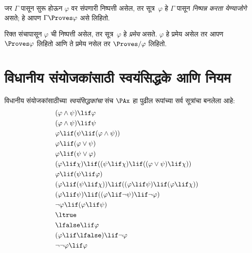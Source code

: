 \begin{defn}[निष्पन्नता]
जर $\Gamma$ पासून सुरू होऊन $\varphi$ वर संपणारी निष्पत्ती असेल, तर
सूत्र~$\varphi$ हे $\Gamma$ पासून \emph{निष्पन्न करता येण्याजोगे} असते; हे आपण
$\Gamma \Proves \varphi$ असे लिहितो.
\end{defn}

\begin{defn}[प्रमेये]
रिक्त संचापासून $\varphi$ ची निष्पत्ती असेल, तर सूत्र~$\varphi$ हे
\emph{प्रमेय} असते. $\varphi$ हे प्रमेय असेल तर आपण $\Proves \varphi$ लिहितो आणि
ते प्रमेय नसेल तर $\Proves/ \varphi$ लिहितो.
\end{defn}













\section{विधानीय संयोजकांसाठी स्वयंसिद्धके आणि नियम}\label{fol:axd:prp:sec}

\begin{defn}[स्वयंसिद्धके]
विधानीय संयोजकांसाठीच्या \emph{स्वयंसिद्धकांचा} संच $\PAx$ हा पुढील रूपांच्या
सर्व सूत्रांचा बनलेला आहे:
\begin{align}
  & (\varphi \land \psi) \lif \varphi \label{fol:axd:prp:ax:land1}\\
  & (\varphi \land \psi) \lif \psi \label{fol:axd:prp:ax:land2}\\
  & \varphi \lif (\psi \lif (\varphi \land \psi)) \label{fol:axd:prp:ax:land3}\\
  & \varphi \lif (\varphi \lor \psi) \label{fol:axd:prp:ax:lor1}\\
  & \varphi \lif (\psi \lor \varphi) \label{fol:axd:prp:ax:lor2}\\
  & (\varphi \lif \chi) \lif ((\psi \lif \chi) \lif ((\varphi \lor \psi) \lif \chi)) \label{fol:axd:prp:ax:lor3}\\
  & \varphi \lif (\psi \lif \varphi) \label{fol:axd:prp:ax:lif1}\\
  & (\varphi \lif (\psi \lif \chi)) \lif ((\varphi \lif \psi) \lif (\varphi \lif \chi)) \label{fol:axd:prp:ax:lif2}\\
  & (\varphi \lif \psi) \lif ((\varphi \lif \lnot \psi) \lif \lnot \varphi) \label{fol:axd:prp:ax:lnot1}\\
  & \lnot \varphi \lif (\varphi \lif \psi) \label{fol:axd:prp:ax:lnot2}\\
  & \ltrue \label{fol:axd:prp:ax:ltrue}\\
  & \lfalse \lif \varphi \label{fol:axd:prp:ax:lfalse1}\\
  & (\varphi \lif \lfalse) \lif \lnot \varphi \label{fol:axd:prp:ax:lfalse2}\\
  & \lnot\lnot \varphi \lif \varphi \label{fol:axd:prp:ax:dne}
\end{align}
\end{defn}

